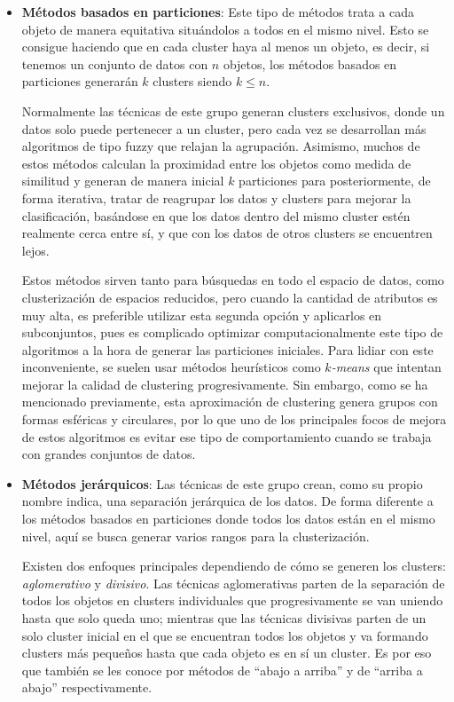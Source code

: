 \documentclass[10pt, a4paper]{article}
\begin{document}
\begin{itemize}
  \item \textbf{Métodos basados en particiones}: Este tipo de métodos trata a cada objeto de manera equitativa situándolos a todos en el mismo nivel. Esto se consigue haciendo que en cada cluster haya al menos un objeto, es decir, si tenemos un conjunto de datos con $n$ objetos, los métodos basados en particiones generarán $k$ clusters siendo $k \leq n$. 

  
  Normalmente las técnicas de este grupo generan clusters exclusivos, donde un datos solo puede pertenecer a un cluster, pero cada vez se desarrollan más algoritmos de tipo fuzzy que relajan la agrupación. Asimismo, muchos de estos métodos calculan la proximidad entre los objetos como medida de similitud y generan de manera inicial $k$ particiones para posteriormente, de forma iterativa, tratar de reagrupar los datos y clusters para mejorar la clasificación, basándose en que los datos dentro del mismo cluster estén realmente cerca entre sí, y que con los datos de otros clusters se encuentren lejos.
  
  Estos métodos sirven tanto para búsquedas en todo el espacio de datos, como clusterización de espacios reducidos, pero cuando la cantidad de atributos es muy alta, es preferible utilizar esta segunda opción y aplicarlos en subconjuntos, pues es complicado optimizar computacionalmente este tipo de algoritmos a la hora de generar las particiones iniciales. Para lidiar con este inconveniente, se suelen usar métodos heurísticos como \textit{$k$-means} que intentan mejorar la calidad de clustering progresivamente. Sin embargo, como se ha mencionado previamente, esta aproximación de clustering genera grupos con formas esféricas y circulares, por lo que uno de los principales focos de mejora de estos algoritmos es evitar ese tipo de comportamiento cuando se trabaja con grandes conjuntos de datos.
  
  \item \textbf{Métodos jerárquicos}: Las técnicas de este grupo crean, como su propio nombre indica, una separación jerárquica de los datos. De forma diferente a los métodos basados en particiones donde todos los datos están en el mismo nivel, aquí se busca generar varios rangos para la clusterización. 
  
  Existen dos enfoques principales dependiendo de cómo se generen los clusters: \textit{aglomerativo} y \textit{divisivo}. Las técnicas aglomerativas parten de la separación de todos los objetos en clusters individuales que progresivamente se van uniendo hasta que solo queda uno; mientras que las técnicas divisivas parten de un solo cluster inicial en el que se encuentran todos los objetos y va formando clusters más pequeños hasta que cada objeto es en sí un cluster. Es por eso que también se les conoce por métodos de ``abajo a arriba'' y de ``arriba a abajo'' respectivamente.
  

\end{itemize}
\end{document}
